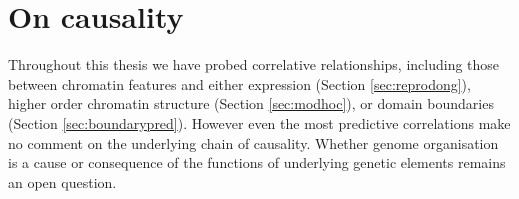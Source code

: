 \documentclass[a4paper,11pt,oneside]{book}
\begin{document}


\section{On causality}


Throughout this thesis we have probed correlative relationships, including those between chromatin features and either expression (Section \ref{sec:reprodong}), higher order chromatin structure (Section \ref{sec:modhoc}), or domain boundaries (Section \ref{sec:boundarypred}). However even the most predictive correlations make no comment on the underlying chain of causality. Whether genome organisation is a cause or consequence of the functions of underlying genetic elements remains an open question.\cite{Sexton2015}
\end{document}
